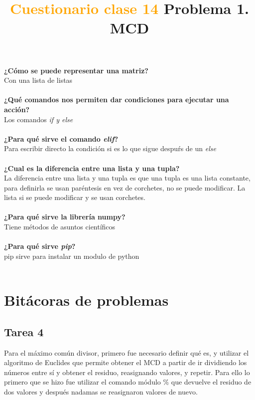 \documentclass{book}
\begin{document}
	\begin{center}
		\title {\textcolor{orange}{\Huge \textbf{Cuestionario clase 14}} }  
	\end{center}
	\textbf{¿Cómo se puede representar una matriz?}\\
	Con una lista de listas\\
	\\
	\textbf{¿Qué comandos nos permiten dar condiciones para ejecutar una acción?}\\
	Los comandos \textit{if y else}\\
	\\
	\textbf{¿Para qué sirve el comando \textit{elif}?}\\
	Para escribir directo la condición si es lo que sigue despuŕs de un \textit{else}\\
	\\
	\textbf{¿Cual es la diferencia entre una lista y una tupla?}\\
	La diferencia entre una lista y una tupla es que una tupla es una lista constante, para definirla se usan paréntesis en vez de corchetes, no se puede modificar. La lista si se puede modificar y se usan corchetes.\\
	\\
	\textbf{¿Para qué sirve la librería numpy?}\\
	Tiene métodos de asuntos científicos\\
	\\
	\textbf{¿Para qué sirve \textit{pip}?}\\
	pip sirve para instalar un modulo de python\\
	\\
	
	\chapter{Bitácoras de problemas}
	\section{Tarea 4}
		\begin{center}
		\title {\Huge Problema 1. MCD} 
	\end{center}
	
	
	Para el máximo común divisor, primero fue necesario definir qué es, y utilizar el algoritmo de Euclides que permite obtener el MCD a partir de ir dividiendo los números entre sí y obtener el residuo, reasignando valores, y repetir. Para ello lo primero que se hizo fue utilizar el comando módulo \% que devuelve el residuo de dos valores y después nadamas se reasignaron valores de nuevo.
	
\end{document}
